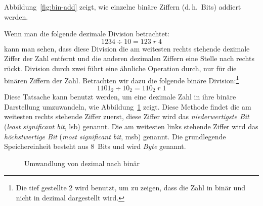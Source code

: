 Abbildung~\ref{fig:bin-add} zeigt, wie einzelne bin\"{a}re Ziffern
(d.\,h.\ Bits) addiert werden.


Wenn man die folgende dezimale Division betrachtet:
\[ 1234 \div 10 = 123\; r\; 4 \]
kann man sehen, dass diese Division die am weitesten rechts stehende
dezimale Ziffer der Zahl entfernt und die anderen dezimalen Ziffern
eine Stelle nach rechts r\"{u}ckt. Division durch zwei f\"{u}hrt eine
\"{a}hnliche Operation durch, nur f\"{u}r die bin\"{a}ren Ziffern der Zahl.
Betrachten wir dazu die folgende bin\"{a}re Division:\footnote{Die tief
gestellte 2 wird benutzt, um zu zeigen, dass die Zahl in bin\"{a}r und
nicht in dezimal dargestellt wird.}
\[ 1101_2 \div 10_2 = 110_2\; r\; 1 \]
Diese Tatsache kann benutzt werden, um eine dezimale Zahl in ihre
bin\"{a}re Darstellung umzuwandeln, wie Abbildung~\ref{fig:dec-convert}
zeigt. Diese Methode findet die am weitesten rechts stehende Ziffer
zuerst, diese Ziffer wird das \emph{niederwertigste Bit}
(\emph{least significant bit}, lsb) genannt. Die am weitesten links
stehende Ziffer wird das \emph{h\"{o}chstwertige Bit} (\emph{most
significant bit}, msb) genannt. Die grundlegende Speichereinheit
besteht aus 8~Bits und wird \emph{Byte}  genannt.

\begin{figure}[ht]
\centering
{}
\caption{Umwandlung von dezimal nach bin\"{a}r \label{fig:dec-convert}}
\end{figure}

